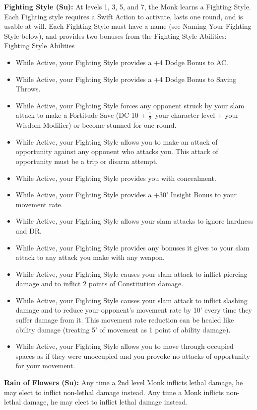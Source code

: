 \documentclass[10pt]{article}
\newcommand{\ability}[2]{\smallskip \noindent \textbf{#1} #2}
\newcommand{\itemspace}[0]{\setlength{\itemsep}{-1mm}}
\newcommand{\half}[0]{\ensuremath{\frac{1}{2}}}
\begin{document}
\ability{Fighting Style (Su):}{At levels 1, 3, 5, and 7, the Monk learns a Fighting Style. Each Fighting style requires a Swift Action to activate, lasts one round, and is usable at will. Each Fighting Style must have a name (see Naming Your Fighting Style below), and provides two bonuses from the Fighting Style Abilities:}
Fighting Style Abilities
\begin{itemize}\itemspace
    \item While Active, your Fighting Style provides a +4 Dodge Bonus to AC.
    \item While Active, your Fighting Style provides a +4 Dodge Bonus to Saving Throws.
    \item While Active, your Fighting Style forces any opponent struck by your slam attack to make a Fortitude Save (DC 10 + \half\  your character level + your Wisdom Modifier) or become stunned for one round.
    \item While Active, your Fighting Style allows you to make an attack of opportunity against any opponent who attacks you. This attack of opportunity must be a trip or disarm attempt.
    \item While Active, your Fighting Style provides you with concealment.
    \item While Active, your Fighting Style provides a +30' Insight Bonus to your movement rate.
    \item While Active, your Fighting Style allows your slam attacks to ignore hardness and DR.
    \item While Active, your Fighting Style provides any bonuses it gives to your slam attack to any attack you make with any weapon.
    \item While Active, your Fighting Style causes your slam attack to inflict piercing damage and to inflict 2 points of Constitution damage.
    \item While Active, your Fighting Style causes your slam attack to inflict slashing damage and to reduce your opponent's movement rate by 10' every time they suffer damage from it. This movement rate reduction can be healed like ability damage (treating 5' of movement as 1 point of ability damage).
    \item While Active, your Fighting Style allows you to move through occupied spaces as if they were unoccupied and you provoke no attacks of opportunity for your movement.
\end{itemize}

\ability{Rain of Flowers (Su):}{Any time a 2nd level Monk inflicts lethal damage, he may elect to inflict non-lethal damage instead. Any time a Monk inflicts non-lethal damage, he may elect to inflict lethal damage instead.}
\end{document}
